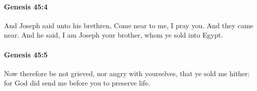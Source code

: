 		\paragraph{Genesis 45:4} %
			\label{GENESIS-45-4}

			And Joseph said unto his brethren, Come near to me, I pray you. And they came near. And he said, I am Joseph your brother, whom ye sold into Egypt.


		\paragraph{Genesis 45:5} %
			\label{GENESIS-45-5}

			Now therefore be not grieved, nor angry with yourselves, that ye sold me hither: for God did send me before you to preserve life.


